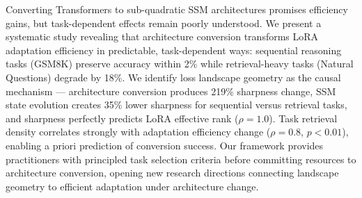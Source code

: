Converting Transformers to sub-quadratic SSM architectures promises efficiency gains, but task-dependent effects remain poorly understood. We present a systematic study revealing that architecture conversion transforms LoRA adaptation efficiency in predictable, task-dependent ways: sequential reasoning tasks (GSM8K) preserve accuracy within 2\% while retrieval-heavy tasks (Natural Questions) degrade by 18\%. We identify loss landscape geometry as the causal mechanism --- architecture conversion produces 219\% sharpness change, SSM state evolution creates 35\% lower sharpness for sequential versus retrieval tasks, and sharpness perfectly predicts LoRA effective rank ($\rho=1.0$). Task retrieval density correlates strongly with adaptation efficiency change ($\rho=0.8$, $p<0.01$), enabling a priori prediction of conversion success. Our framework provides practitioners with principled task selection criteria before committing resources to architecture conversion, opening new research directions connecting landscape geometry to efficient adaptation under architecture change.
